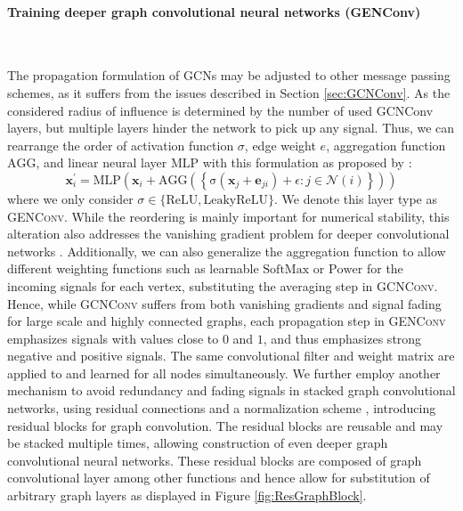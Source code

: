 \documentclass[]{article}
\renewcommand{\cite}{\citep}
\begin{document}
\paragraph{Training deeper graph convolutional neural networks (GENConv)}\mbox{}\\
\label{sec:GENConv}

The propagation formulation of GCNs may be adjusted to other message passing schemes, as it suffers from the issues described in Section \ref{sec:GCNConv}. As the considered radius of influence is determined by the number of used GCNConv layers, but multiple layers hinder the network to pick up any signal. Thus, we
can rearrange the order of activation function $\sigma$, edge weight $e$, aggregation function
$\mathrm{AGG}$, and linear neural layer $\mathrm{MLP}$ with this
formulation as proposed by \cite{GENConv2020}:
\begin{equation}
	\mathbf{x}_i^{\prime} = \mathrm{MLP} \left( \mathbf{x}_i +
	\mathrm{AGG} \left( \left\{
	\mathrm{\sigma} \left( \mathbf{x}_j + \mathbf{e}_{ji} \right) +\epsilon
	: j \in \mathcal{N}(i) \right\} \right)
	\right)
\end{equation}
where we only consider
$\sigma \in \{\mathrm{ReLU}, \mathrm{LeakyReLU}\}$. We denote this layer type as \textsc{GENConv}.  While the reordering is
mainly important for numerical stability, this alteration also addresses
the vanishing gradient problem for deeper convolutional networks
\cite{GENConv2020}. Additionally, we can also generalize the
aggregation function to allow different weighting functions such as
learnable $\mathrm{SoftMax}$ or $\mathrm{Power}$ for the incoming
signals for each vertex, substituting the averaging step in
\textsc{GCNConv}. Hence, while \textsc{GCNConv} suffers from both
vanishing gradients and signal fading for large scale and highly
connected graphs, each propagation step in \textsc{GENConv} emphasizes
signals with values close to $0$ and $1$, and thus emphasizes strong negative and positive signals. The same convolutional
filter and weight matrix are applied to and learned for all nodes
simultaneously. 
We further employ another mechanism to avoid redundancy and fading
signals in stacked graph convolutional networks, using residual
connections and a normalization scheme \cite{DeepGCN2019, GENConv2020}, introducing residual blocks for graph convolution. The residual
blocks are reusable and may be stacked multiple times, allowing construction of even deeper graph convolutional neural networks. These residual blocks are composed of graph convolutional layer among other functions and hence allow for substitution of arbitrary graph layers as displayed in Figure \ref{fig:ResGraphBlock}.\\
\end{document}
